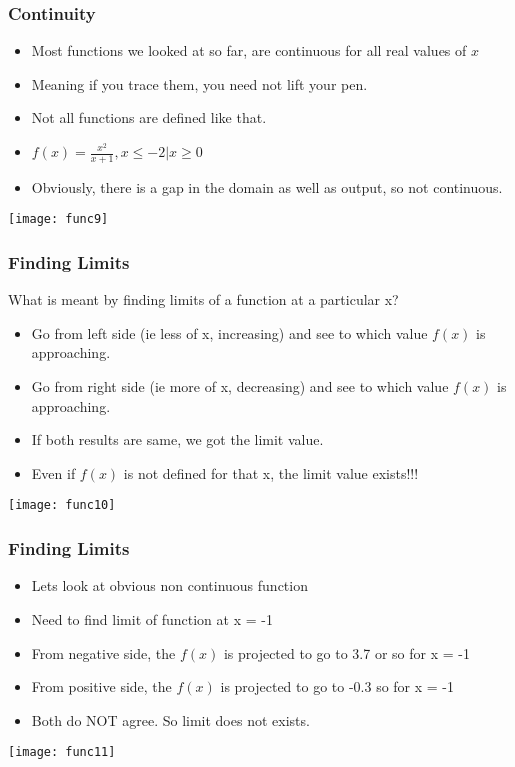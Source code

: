  \begin{frame}[fragile]\frametitle{Continuity}
\begin{itemize}
\item Most functions we looked at so far, are continuous for all real values of $x$
\item Meaning if you trace them, you need not lift your pen.
\item Not all functions are defined like that.
\item $f(x) = \frac{x^2}{x+1}, x \leq -2 | x \geq 0$
\item Obviously, there is a gap in the domain as well as output, so not continuous.
\end{itemize}
\begin{center}
\texttt{[image: func9]}
\end{center}
\end{frame}

 \begin{frame}[fragile]\frametitle{Finding Limits}
 What is meant by finding limits of a function at a particular x?
\begin{itemize}
\item Go from left side (ie less of x, increasing) and see to which value $f(x)$ is approaching.
\item Go from right side (ie more of x, decreasing) and see to which value $f(x)$ is approaching.
\item If both results are same, we got the limit value.
\item Even if $f(x)$ is not defined for that x, the limit value exists!!!
\end{itemize}
\begin{center}
\texttt{[image: func10]}
\end{center}
\end{frame}

 \begin{frame}[fragile]\frametitle{Finding Limits}
\begin{itemize}
\item Lets look at obvious non continuous function
\item Need to find limit of function at x = -1
\item From negative side, the $f(x)$ is projected to go to 3.7 or so for x = -1
\item From positive side, the $f(x)$ is projected to go to -0.3 so for x = -1
\item Both do NOT agree. So limit does not exists.
\end{itemize}
\begin{center}
\texttt{[image: func11]}
\end{center}
\end{frame}


